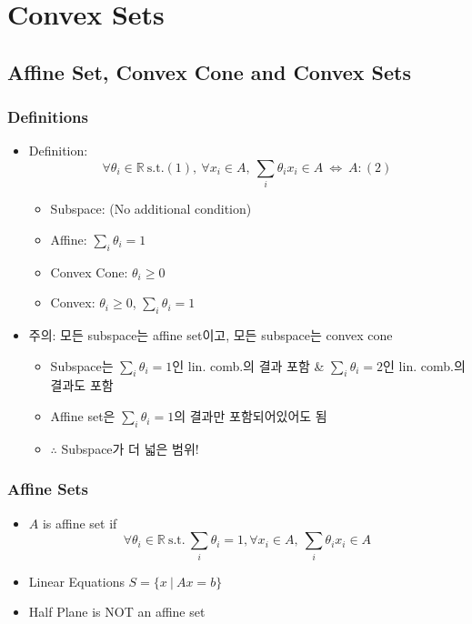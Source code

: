 \section{Convex Sets}

\subsection{Affine Set, Convex Cone and Convex Sets}

\subsubsection*{Definitions}
\begin{itemize}
    \item Definition:
    \begin{equation}
        \forall \theta_i \in \mathbb{R}~\mathrm{s.t. (1)},~\forall x_i \in A,~\sum_i \theta_i x_i \in A~\Leftrightarrow~A: \mathrm{(2)}
    \end{equation}
    \begin{itemize}
        \item Subspace: (No additional condition)
        \item Affine: $\sum_i \theta_i = 1$
        \item Convex Cone: $\theta_i \geq 0$
        \item Convex: $\theta_i \geq 0$, $\sum_i \theta_i = 1$
    \end{itemize}
    \item 주의: 모든 subspace는 affine set이고, 모든 subspace는 convex cone
    \begin{itemize}
        \item Subspace는 $\sum_i \theta_i = 1$인 lin. comb.의 결과 포함 \& $\sum_i \theta_i = 2$인 lin. comb.의 결과도 포함
        \item Affine set은 $\sum_i \theta_i = 1$의 결과만 포함되어있어도 됨
        \item $\therefore$ Subspace가 더 넓은 범위!
    \end{itemize}
\end{itemize}

\subsubsection*{Affine Sets}
\begin{itemize}
    \item $A$ is affine set if
    \begin{equation}
        \forall \theta_i \in \mathbb{R}~\mathrm{s.t.}~\sum_i \theta_i = 1,\forall x_i \in A,~\sum_i \theta_i x_i \in A
    \end{equation}
    \item Linear Equations $S = \{x~|~Ax=b\}$
    \item Half Plane is NOT an affine set
\end{itemize}

